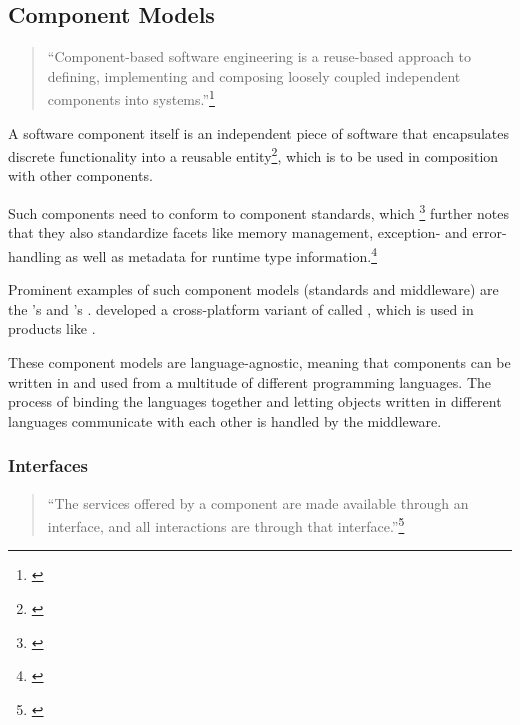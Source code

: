 \subsection{Component Models}
\label{sec:ComponentModels}

\begin{quotation}
``Component-based software engineering is a reuse-based approach to defining, implementing and composing loosely coupled independent components into systems.''\footnote{\citep[460]{Sommerville}}
\end{quotation}

A software component itself is an independent piece of software that encapsulates discrete functionality into a reusable entity\footnote{\citep[3]{ComponentTechnology}}, which is to be used in composition with other components.

Such components need to conform to component standards, which \footnote{\citep[440]{Sommerville}}  further notes that they also standardize facets like memory management, exception- and error-handling as well as metadata for runtime type information.\footnote{\citep[8]{ComponentTechnology}}

Prominent examples of such component models (standards and middleware) are the 's  and 's .  developed a cross-platform variant of  called , which is used in products like .

These component models are language-agnostic, meaning that components can be written in and used from a multitude of different programming languages. The process of binding the languages together and letting objects written in different languages communicate with each other is handled by the middleware.

\subsubsection{Interfaces}

\begin{quotation}
``The services offered by a component are made available through an interface, and all interactions are through that interface.''\footnote{\citep[444]{Sommerville}}
\end{quotation}

